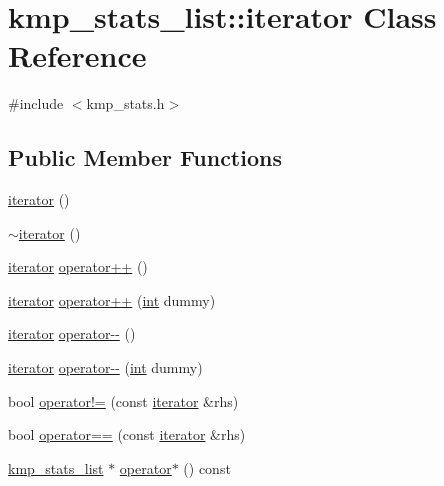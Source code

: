 \hypertarget{classkmp__stats__list_1_1iterator}{\section{kmp\-\_\-stats\-\_\-list\-:\-:iterator Class Reference}
\label{classkmp__stats__list_1_1iterator}
}


{\ttfamily \#include $<$kmp\-\_\-stats.\-h$>$}

\subsection*{Public Member Functions}
\begin{DoxyCompactItemize}
\item 
\hyperlink{classkmp__stats__list_1_1iterator_a173205ad289a48b88462c39c3cfe94fb}{iterator} ()
\item 
\hyperlink{classkmp__stats__list_1_1iterator_a710e71b657dae0a9367fceff301c3e33}{$\sim$iterator} ()
\item 
\hyperlink{classkmp__stats__list_1_1iterator}{iterator} \hyperlink{classkmp__stats__list_1_1iterator_aaa95a20709c42003884aadbd0971675b}{operator++} ()
\item 
\hyperlink{classkmp__stats__list_1_1iterator}{iterator} \hyperlink{classkmp__stats__list_1_1iterator_a745be3aa7b9b76dd63333b59e4e65184}{operator++} (\hyperlink{ittnotify__static_8h_a8b8dcd723308a8cb5d84277c7a3fff70}{int} dummy)
\item 
\hyperlink{classkmp__stats__list_1_1iterator}{iterator} \hyperlink{classkmp__stats__list_1_1iterator_a622259d8da5e2bd92182eeef661e4e42}{operator-\/-\/} ()
\item 
\hyperlink{classkmp__stats__list_1_1iterator}{iterator} \hyperlink{classkmp__stats__list_1_1iterator_ac9d2ec59d1424d5c1b18af6ec134e1f7}{operator-\/-\/} (\hyperlink{ittnotify__static_8h_a8b8dcd723308a8cb5d84277c7a3fff70}{int} dummy)
\item 
bool \hyperlink{classkmp__stats__list_1_1iterator_a3d67b1a0507db2b4464c5b7ef1e75cd6}{operator!=} (const \hyperlink{classkmp__stats__list_1_1iterator}{iterator} \&rhs)
\item 
bool \hyperlink{classkmp__stats__list_1_1iterator_a26eb2b12af64b399136b0db96ece4754}{operator==} (const \hyperlink{classkmp__stats__list_1_1iterator}{iterator} \&rhs)
\item 
\hyperlink{classkmp__stats__list}{kmp\-\_\-stats\-\_\-list} $\ast$ \hyperlink{classkmp__stats__list_1_1iterator_a84cad9bdc6adc35adab992f9036d1da0}{operator$\ast$} () const 
\end{DoxyCompactItemize}

